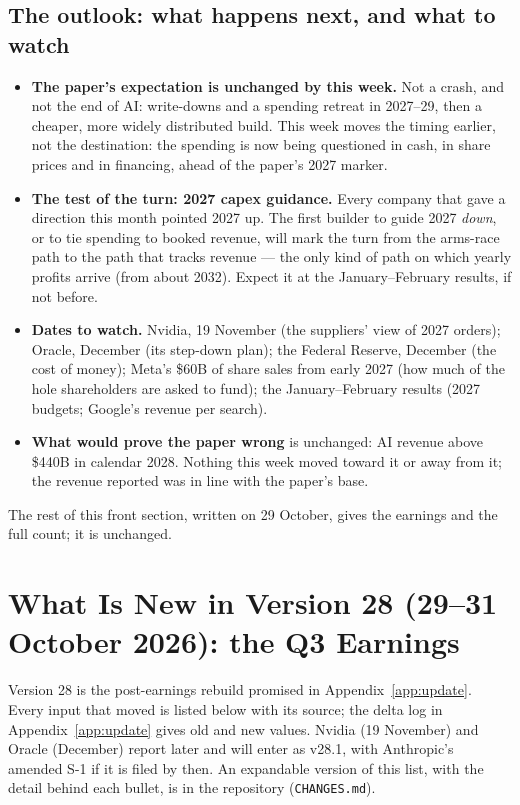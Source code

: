 \documentclass[11pt,letterpaper]{article}
\begin{document}
\subsection*{The outlook: what happens next, and what to watch}\label{news:outlook}
\begin{itemize}
\item \textbf{The paper's expectation is unchanged by this week.} Not a crash, and not the end of AI: write-downs and a spending retreat in 2027--29, then a cheaper, more widely distributed build. This week moves the timing earlier, not the destination: the spending is now being questioned in cash, in share prices and in financing, ahead of the paper's 2027 marker.
\item \textbf{The test of the turn: 2027 capex guidance.} Every company that gave a direction this month pointed 2027 up. The first builder to guide 2027 \emph{down}, or to tie spending to booked revenue, will mark the turn from the arms-race path to the path that tracks revenue --- the only kind of path on which yearly profits arrive (from about 2032). Expect it at the January--February results, if not before.
\item \textbf{Dates to watch.} Nvidia, 19 November (the suppliers' view of 2027 orders); Oracle, December (its step-down plan); the Federal Reserve, December (the cost of money); Meta's \$60B of share sales from early 2027 (how much of the hole shareholders are asked to fund); the January--February results (2027 budgets; Google's revenue per search).
\item \textbf{What would prove the paper wrong} is unchanged: AI revenue above \$440B in calendar 2028. Nothing this week moved toward it or away from it; the revenue reported was in line with the paper's base.
\end{itemize}
\noindent The rest of this front section, written on 29 October, gives the earnings and the full count; it is unchanged.

\section*{What Is New in Version 28 (29--31 October 2026): the Q3 Earnings}\label{sec:v28}
Version 28 is the post-earnings rebuild promised in Appendix~\ref{app:update}. Every input that moved is listed below with its source; the delta log in Appendix~\ref{app:update} gives old and new values. Nvidia (19 November) and Oracle (December) report later and will enter as v28.1, with Anthropic's amended S-1 if it is filed by then. An expandable version of this list, with the detail behind each bullet, is in the repository (\texttt{CHANGES.md}).
\end{document}
